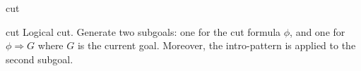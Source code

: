 \begin{tactic}{cut}
  \begin{tsyntax}[empty]{cut}
  Logical cut. Generate two subgoals: one for the cut formula $\phi$,
  and one for $\phi \Rightarrow G$ where $G$ is the current goal. Moreover,
  the intro-pattern \tct{$\iota$} is applied to the second subgoal.
  \end{tsyntax}
\end{tactic}
